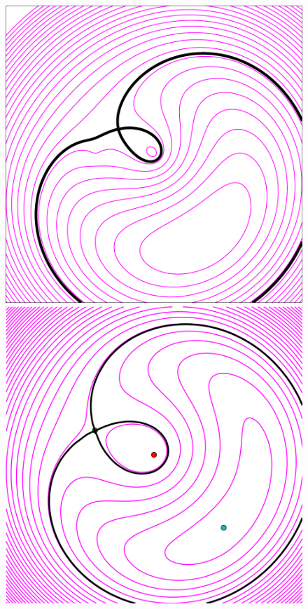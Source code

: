 \documentclass[usenatbib]{mn2e}
\newlength{\myplotswidth}
\begin{document}
\begin{figure}
  \includegraphics[width=\myplotswidth]{fig/ASW000195x_006975_arriv}
  \includegraphics[width=\myplotswidth]{fig/006975_spaghetti} \\

\end{figure}
\end{document}

